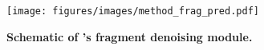 \begin{figure}[h!]
    \centering
    \texttt{[image: figures/images/method\_frag\_pred.pdf]}
    \caption{\textbf{Schematic of \methodname{}’s fragment denoising module.}}
    \label{fig:method_frag_pred}
\end{figure}